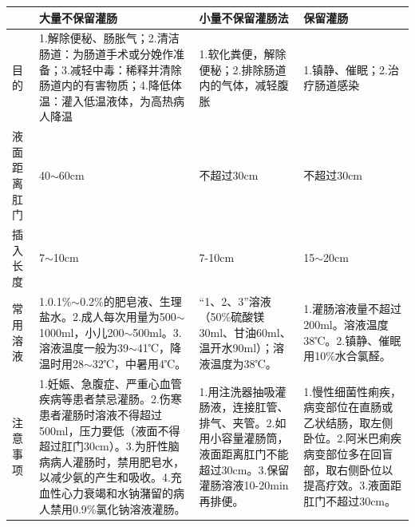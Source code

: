 \documentclass[11pt, a4paper]{ctexart}
\begin{document}
\begin{table}[htbp]
	\centering
	\begin{tabular}{|p{3cm}|p{4cm}|p{4cm}|p{4cm}|}
		\hline
		       & \textbf{大量不保留灌肠}                                                                                                               & \textbf{小量不保留灌肠法}                                                     & \textbf{保留灌肠}                                                            \\
		\hline
		目的     & 1.解除便秘、肠胀气；2.清洁肠道：为肠道手术或分娩作准备；3.减轻中毒：稀释并清除肠道内的有害物质；4.降低体温：灌入低温液体，为高热病人降温                                                       & 1.软化粪便，解除便秘；2.排除肠道内的气体，减轻腹胀                                           & 1.镇静、催眠；2.治疗肠道感染                                                         \\
		\hline
		液面距离肛门 & 40$\sim$60cm                                                                                                                   & 不超过30cm                                                               & 不超过30cm                                                                  \\
		\hline
		插入长度   & 7$\sim$10cm                                                                                                                    & 7-10cm                                                                & 15$\sim$20cm                                                             \\
		\hline
		常用溶液   & 1.0.1\%$\sim$0.2\%的肥皂液、生理盐水。2.成人每次用量为500$\sim$1000ml，小儿200$\sim$500ml。3.溶液温度一般为39$\sim$41℃，降温时用28$\sim$32℃，中暑用4℃。              & “1、2、3”溶液（50\%硫酸镁30ml、甘油60ml、温开水90ml）；溶液温度为38℃。                       & 1.灌肠溶液量不超过200ml。溶液温度38℃。2.镇静、催眠用10\%水合氯醛。                                \\
		\hline
		注意事项   & 1.妊娠、急腹症、严重心血管疾病等患者禁忌灌肠。2.伤寒患者灌肠时溶液不得超过500ml，压力要低（液面不得超过肛门30cm）。3.为肝性脑病病人灌肠时，禁用肥皂水，以减少氨的产生和吸收。4.充血性心力衰竭和水钠潴留的病人禁用0.9\%氯化钠溶液灌肠。 & 1.用注洗器抽吸灌肠液，连接肛管、排气、夹管。2.如用小容量灌肠筒，液面距离肛门不能超过30cm。3.保留灌肠溶液10-20min再排便。 & 1.慢性细菌性痢疾，病变部位在直肠或乙状结肠，取左侧卧位。2.阿米巴痢疾病变部位多在回盲部，取右侧卧位以提高疗效。3.液面距肛门不超过30cm。 \\
		\hline
	\end{tabular}
\end{table}
\end{document}
